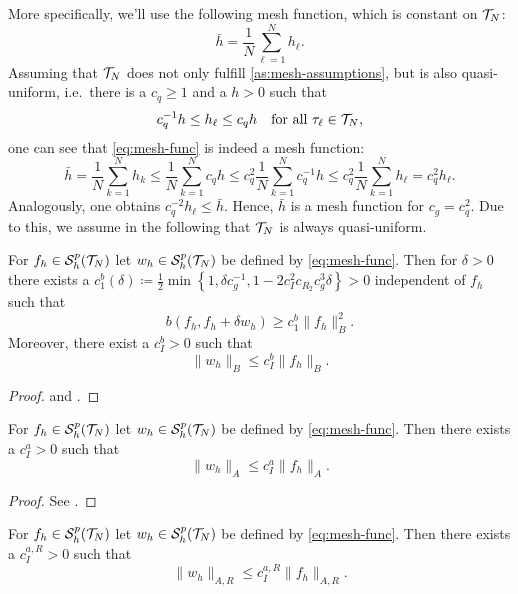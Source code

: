 \documentclass[../thesis.tex]{subfiles}
\begin{document}
More specifically, we'll use the following mesh function, which is constant on $\mathcal{T}_N$:
\begin{equation}
\label{eq:mesh-func}
	\bar{h} = \frac{1}{N} \sum_{\ell = 1}^N h_\ell.
\end{equation}
Assuming that $\mathcal{T}_N$ does not only fulfill \cref{as:mesh-assumptions}, but is also quasi-uniform, i.e.\ there is a $c_q \geq 1$ and a $h > 0$ such that
\[
	c_q^{-1} h \leq h_\ell \leq c_q h \quad \text{for all } \tau_\ell \in \mathcal{T}_N,
\]
one can see that \cref{eq:mesh-func} is indeed a mesh function:
\[
	\bar{h} = \frac{1}{N} \sum_{k = 1}^N h_k \leq \frac{1}{N} \sum_{k=1}^N c_q h \leq c_q^2 \frac{1}{N} \sum_{k=1}^N c_q^{-1} h \leq c_q^2 \frac{1}{N} \sum_{k=1}^N h_\ell = c_q^2 h_\ell.
\]
Analogously, one obtains $c_q^{-2} h_\ell \leq \bar{h}$. Hence, $\bar{h}$ is a mesh function for $c_g = c_q^2$.
Due to this, we assume in the following that $\mathcal{T}_N$ is always quasi-uniform.
\begin{lemma}
\label{thm:wh-b-bound}
For $f_h \in \mathcal{S}_h^p(\mathcal{T}_N)$ let $w_h \in \mathcal{S}_h^p(\mathcal{T}_N)$ be defined by \cref{eq:mesh-func}.
Then for $\delta > 0$ there exists a $c_1^b(\delta) \coloneqq \frac{1}{2} \min \left\{ 1, \delta c_g^{-1}, 1 - 2 c_I^2 c_{R_2} c_g^3 \delta \right\} > 0$ independent of $f_h$ such that
\[
	b(f_h, f_h + \delta w_h) \geq c_1^b \| f_h \|_B^2.
\]
Moreover, there exist a $c_I^b > 0$ such that
\[
	\| w_h \|_B \leq c_I^b \| f_h \|_B.
\]
\end{lemma}
\begin{proof}
\cite[Lemma 2.2.14]{Neumueller} and \cite[Lemma 2.2.15]{Neumueller}.
\end{proof}
\begin{lemma}
\label{thm:wh-A-bound}
For $f_h \in \mathcal{S}_h^p(\mathcal{T}_N)$ let $w_h \in \mathcal{S}_h^p(\mathcal{T}_N)$ be defined by \cref{eq:mesh-func}. Then there exists a $c_I^a > 0$ such that
\[
	\| w_h \|_A \leq c_I^a \| f_h \|_A.
\]
\end{lemma}
\begin{proof}
See \cite[Lemma 2.2.19]{Neumueller}.
\end{proof}
\begin{lemma}
\label{thm:wh-aR-bound}
For $f_h \in \mathcal{S}_h^p(\mathcal{T}_N)$ let $w_h \in \mathcal{S}_h^p(\mathcal{T}_N)$ be defined by \cref{eq:mesh-func}. Then there exists a $c_I^{a, R} > 0$ such that
\[
	\| w_h \|_{A, R} \leq c_I^{a, R} \| f_h \|_{A, R}.
\]
\end{lemma}
\end{document}
